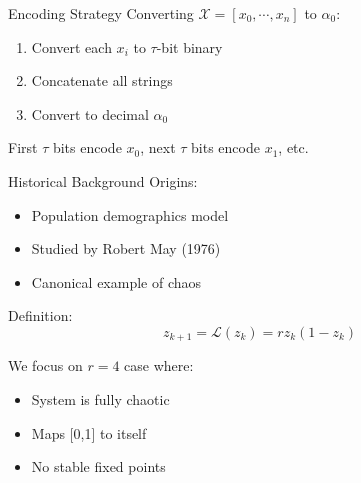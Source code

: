 \documentclass[10pt]{beamer}
\begin{document}
\begin{frame}{Encoding Strategy}
Converting $\mathcal{X} = [x_0,\cdots,x_n]$ to $\alpha_0$:

\begin{enumerate}
\item Convert each $x_i$ to $\tau$-bit binary
\item Concatenate all strings
\item Convert to decimal $\alpha_0$
\end{enumerate}

\begin{center}
\end{center}

First $\tau$ bits encode $x_0$, next $\tau$ bits encode $x_1$, etc.
\end{frame}

\begin{frame}{Historical Background}
Origins:
\begin{itemize}
\item Population demographics model
\item Studied by Robert May (1976)
\item Canonical example of chaos
\end{itemize}

Definition:
\[ z_{k+1} = \mathcal{L}(z_k) = rz_k(1-z_k) \]

We focus on $r=4$ case where:
\begin{itemize}
\item System is fully chaotic
\item Maps [0,1] to itself
\item No stable fixed points
\end{itemize}
\end{frame}
\end{document}
